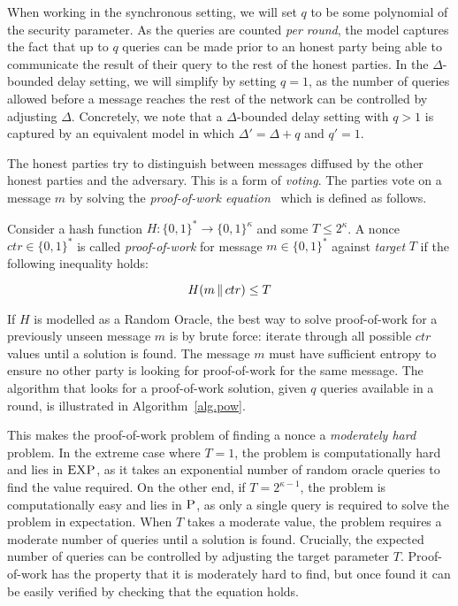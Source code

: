 When working in the synchronous setting, we will set $q$ to be some polynomial
of the security parameter. As the queries are counted \emph{per round}, the
model captures the fact that up to $q$ queries can be made prior to an honest
party being able to communicate the result of their query to the rest of the
honest parties. In the $\Delta$-bounded delay setting, we will simplify by
setting $q = 1$, as the number of queries allowed before a message reaches the
rest of the network can be controlled by adjusting $\Delta$. Concretely, we note
that a $\Delta$-bounded delay setting with $q > 1$ is captured by an equivalent
model in which $\Delta' = \Delta + q$ and $q' = 1$.

The honest parties try to distinguish between messages diffused by the other
honest parties and the adversary. This is a form of \emph{voting}. The parties
vote on a message $m$ by solving the \emph{proof-of-work equation}~\cite{pow}
which is defined as follows.

\begin{definition}
  Consider a hash function $H: \{0, 1\}^* \rightarrow \{0, 1\}^\kappa$ and some
  $T \leq 2^\kappa$.
  A nonce
  $ctr \in \{0, 1\}^*$ is called \emph{proof-of-work}
  for message $m \in \{0, 1\}^*$ against \emph{target} $T$ if the following inequality
  holds:

  \[
  H(m \,\|\, ctr) \leq T
  \]
\end{definition}

If $H$ is modelled as a Random Oracle,
the best way to solve proof-of-work for a previously unseen message $m$ is by
brute force: iterate through all possible $ctr$ values until a solution is
found.
The message $m$ must have sufficient entropy to ensure no other party is looking
for proof-of-work for the same message. The algorithm that looks for
a proof-of-work solution, given $q$ queries available in a round, is illustrated
in Algorithm~\ref{alg.pow}.



This makes the proof-of-work problem of
finding a nonce a \emph{moderately hard} problem. In the extreme case
where $T = 1$, the problem is computationally hard and lies in $\textsc{EXP}$,
as it takes an exponential number of random oracle queries to find the value
required.
On the other end, if $T = 2^{\kappa-1}$, the problem is computationally easy and
lies in $\textsc{P}$, as only a single query is required to solve the problem
in expectation. When $T$ takes a moderate value, the problem requires a moderate
number of queries until a solution is found. Crucially, the expected number of
queries can be controlled by adjusting the target parameter $T$. Proof-of-work
has the property that it is moderately hard to find, but once found it can be
easily verified by checking that the equation holds.

